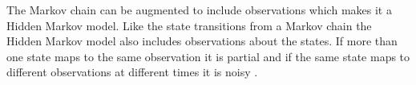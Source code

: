 The Markov chain can be augmented to include observations which makes it a
Hidden Markov model. Like the state transitions from a Markov chain the Hidden
Markov model also includes observations about the states. If more than one state
maps to the same observation it is partial and if the same state maps to
different observations at different times it is noisy \citep[6.5.2]{MIBook}.\nl 
% 
% 

